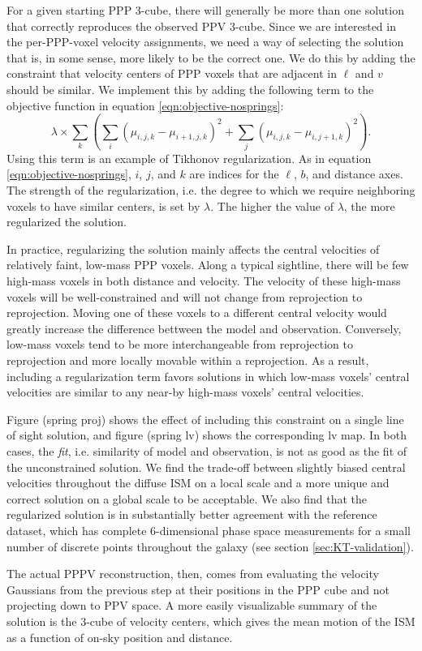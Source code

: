 For a given starting PPP 3-cube, there will generally be more than one solution that correctly reproduces the observed PPV 3-cube. Since we are interested in the per-PPP-voxel velocity assignments, we need a way of selecting the solution that is, in some sense, more likely to be the correct one. We do this by adding the constraint that velocity centers of PPP voxels that are adjacent in $\ell$ and $v$ should be similar. We implement this by adding the following term to the objective function in equation \ref{eqn:objective-nosprings}:
\begin{equation}
    \lambda \times \sum_k \left( \sum_i (\mu_{i,j,k} - \mu_{i+1,j,k})^2 + 
    \sum_j (\mu_{i,j,k} - \mu_{i,j+1,k})^2 \right).
\end{equation}
Using this term is an example of Tikhonov regularization. As in equation \ref{eqn:objective-nosprings}, $i$, $j$, and $k$ are indices for the $\ell$, $b$, and distance axes. The strength of the regularization, i.e. the degree to which we require neighboring voxels to have similar centers, is set by $\lambda$. The higher the value of $\lambda$, the more regularized the solution.

In practice, regularizing the solution mainly affects the central velocities of relatively faint, low-mass PPP voxels. Along a typical sightline, there will be few high-mass voxels in both distance and velocity. The velocity of these high-mass voxels will be well-constrained and will not change from reprojection to reprojection. Moving one of these voxels to a different central velocity would greatly increase the difference bettween the model and observation. Conversely, low-mass voxels tend to be more interchangeable from reprojection to reprojection and more locally movable within a reprojection. As a result, including a regularization term favors solutions in which low-mass voxels' central velocities are similar to any near-by high-mass voxels' central velocities.

Figure (spring proj) shows the effect of including this constraint on a single line of sight solution, and figure (spring lv) shows the corresponding lv map. In both cases, the \emph{fit}, i.e. similarity of model and observation, is not as good as the fit of the unconstrained solution. We find the trade-off between slightly biased central velocities throughout the diffuse ISM on a local scale and a more unique and correct solution on a global scale to be acceptable. We also find that the regularized solution is in substantially better agreement with the reference dataset, which has complete 6-dimensional phase space measurements for a small number of discrete points throughout the galaxy (see section \ref{sec:KT-validation}). 

The actual PPPV reconstruction, then, comes from evaluating the velocity Gaussians from the previous step at their positions in the PPP cube and not projecting down to PPV space. A more easily visualizable summary of the solution is the 3-cube of velocity centers, which gives the mean motion of the ISM as a function of on-sky position and distance.
